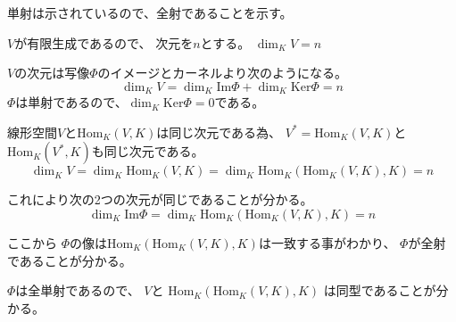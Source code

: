 \documentclass[12pt,b5paper]{ltjsarticle}
\begin{document}
\begin{enumerate}
       単射は示されているので、全射であることを示す。

       $V$が有限生成であるので、
       次元を$n$とする。
       $\dim_{K}V =n$

       $V$の次元は写像$\Phi$のイメージとカーネルより次のようになる。
       \begin{equation}
        \dim_{K}V = \dim_{K} \mathrm{Im}\Phi + \dim_{K} \mathrm{Ker}\Phi
         = n
       \end{equation}
       $\Phi$は単射であるので、$\dim_{K} \mathrm{Ker}\Phi =0$である。

       線形空間$V$と$\mathrm{Hom}_K(V,K)$は同じ次元である為、
       $V^{*}=\mathrm{Hom}_K(V,K)$と$\mathrm{Hom}_K(V^{*},K)$も同じ次元である。
       \begin{equation}
        \dim_{K} V
         =
        \dim_{K}\mathrm{Hom}_K(V,K)
         =
        \dim_{K}\mathrm{Hom}_K(\mathrm{Hom}_K(V,K),K)
        =n
       \end{equation}

       これにより次の2つの次元が同じであることが分かる。
       \begin{equation}
        \dim_{K} \mathrm{Im}\Phi
         =
        \dim_{K}\mathrm{Hom}_K(\mathrm{Hom}_K(V,K),K)
        =n
       \end{equation}

       ここから
       $\Phi$の像は$\mathrm{Hom}_K(\mathrm{Hom}_K(V,K),K)$は一致する事がわかり、
       $\Phi$が全射であることが分かる。

       $\Phi$は全単射であるので、
       $V$と
       $\mathrm{Hom}_K(\mathrm{Hom}_K(V,K),K)$
       は同型であることが分かる。

%


%
%
%
%
%


\end{enumerate}
\end{document}

